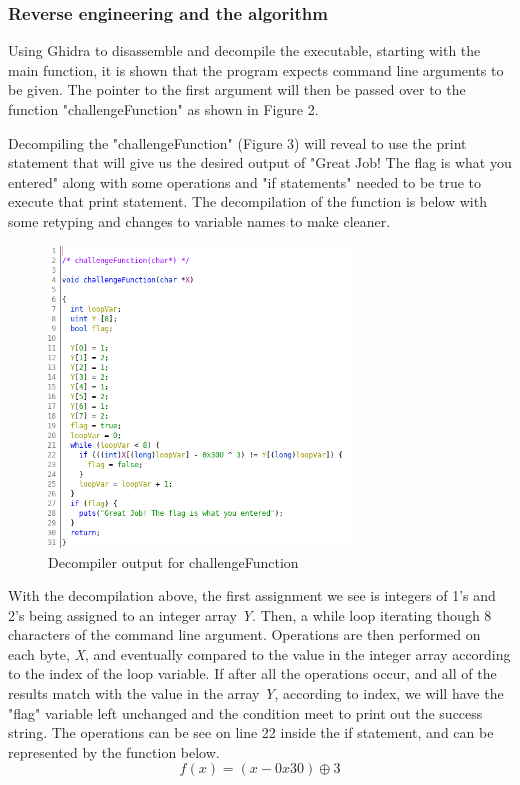\documentclass[conference]{IEEEtran}
\begin{document}
\subsubsection{Reverse engineering and the algorithm}
Using Ghidra to disassemble and decompile the executable, starting with the main function, it is shown that the program expects command line arguments to be given. The pointer to the first argument will then be passed over to the function "challengeFunction" as shown in Figure 2.


Decompiling the "challengeFunction" (Figure 3) will reveal to use the print statement that will give us the desired output of "Great Job! The flag is what you entered" along with some operations and "if statements" needed to be true to execute that print statement. The decompilation of the function is below with some retyping and changes to variable names to make cleaner. 

\begin{figure}
    \centering
    \includegraphics[width=8cm, height=8cm]{challenge.png}
    \caption{Decompiler output for challengeFunction}
    \label{fig:my_label}
\end{figure}

With the decompilation above, the first assignment we see is integers of 1's and 2's being assigned to an integer array \textit{Y}. Then, a while loop iterating though 8 characters of the command line argument. Operations are then performed on each byte, \textit{X}, and eventually compared to the value in the integer array according to the index of the loop variable. If after all the operations occur, and all of the results match with the value in the array \textit{Y}, according to index, we will have the "flag" variable left unchanged and the condition meet to print out the success string. The operations can be see on line 22 inside the if statement, and can be represented by the function below.
\begin{equation}
    f(x) = (x - 0x30) \oplus 3
\end{equation} 
\end{document}
